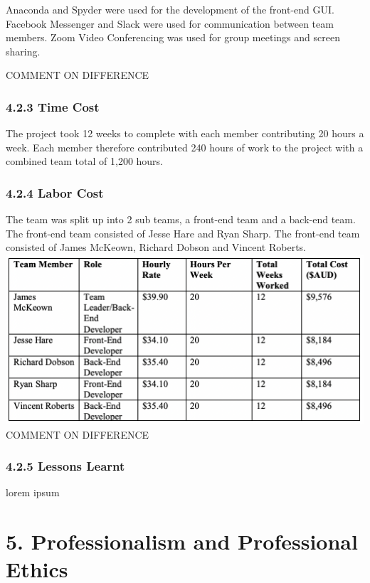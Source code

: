 \documentclass[11pt]{article}
\begin{document}
Anaconda and Spyder were used for the development of the front-end GUI. Facebook Messenger and Slack were used for communication between team members. Zoom Video Conferencing was used for group meetings and screen sharing.

COMMENT ON DIFFERENCE

\subsubsection{4.2.3 Time Cost}
The project took 12 weeks to complete with each member contributing 20 hours a week. Each member therefore contributed 240 hours of work to the project with a combined team total of 1,200 hours.

\subsubsection{4.2.4 Labor Cost}
The team was split up into 2 sub teams, a front-end team and a back-end team. The front-end team consisted of Jesse Hare and Ryan Sharp. The front-end team consisted of James McKeown, Richard Dobson and Vincent Roberts. \\

\includegraphics[scale=0.71]{team_cost.png} \\

COMMENT ON DIFFERENCE

\subsubsection{4.2.5 Lessons Learnt}
lorem ipsum



\section{5. Professionalism and Professional Ethics}
\end{document}
